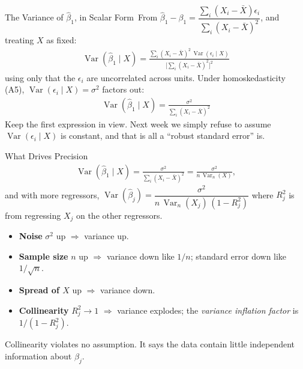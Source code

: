 \documentclass[aspectratio=169,11pt,xcolor=dvipsnames]{beamer}
\DeclareMathOperator{\Var}{Var}
\newcommand{\core}{\,\raisebox{0.6pt}{\textcolor{corestar}{$\bigstar$}}}
\begin{document}
\begin{frame}{The Variance of $\hat\beta_1$, in Scalar Form\core}
From $\hat\beta_1 - \beta_1 = \dfrac{\sum_i (X_i - \bar X)\epsilon_i}{\sum_i (X_i-\bar X)^2}$,
and treating $X$ as fixed:
\begin{align*}
  \Var(\hat\beta_1\mid X)
  = \frac{\sum_i (X_i-\bar X)^2\,\Var(\epsilon_i\mid X)}
         {\big[\sum_i (X_i - \bar X)^2\big]^2}
\end{align*}
using only that the $\epsilon_i$ are uncorrelated across units.
\pause
\vskip4pt
Under homoskedasticity (A5), $\Var(\epsilon_i\mid X)=\sigma^2$ factors out:
\begin{align*}
  \boxed{\;\Var(\hat\beta_1\mid X) = \frac{\sigma^2}{\sum_i (X_i - \bar X)^2}\;}
\end{align*}
\alert{Keep the first expression in view.} Next week we simply refuse to assume
$\Var(\epsilon_i\mid X)$ is constant, and that is all a ``robust standard
error'' is.
\end{frame}

\begin{frame}{What Drives Precision\core}
\begin{align*}
  \Var(\hat\beta_1\mid X) = \frac{\sigma^2}{\sum_i (X_i - \bar X)^2}
  = \frac{\sigma^2}{n\,\Var_n(X)} ,
\end{align*}
and with more regressors,
$\Var(\hat\beta_j) = \dfrac{\sigma^2}{n\,\Var_n(X_j)\,(1-R_j^2)}$
where $R_j^2$ is from regressing $X_j$ on the other regressors.
\vskip4pt
\begin{itemize}\itemsep3pt
  \item \textbf{Noise} $\sigma^2$ up $\Rightarrow$ variance up.
  \item \textbf{Sample size} $n$ up $\Rightarrow$ variance down like $1/n$;
        standard error down like $1/\sqrt n$.
  \item \textbf{Spread of $X$} up $\Rightarrow$ variance down.
  \item \textbf{Collinearity} $R_j^2 \to 1$ $\Rightarrow$ variance explodes; the
        \emph{variance inflation factor} is $1/(1-R_j^2)$.
\end{itemize}
\vskip3pt
Collinearity violates no assumption. It says the data contain little independent
information about $\beta_j$.
\end{frame}
\end{document}
